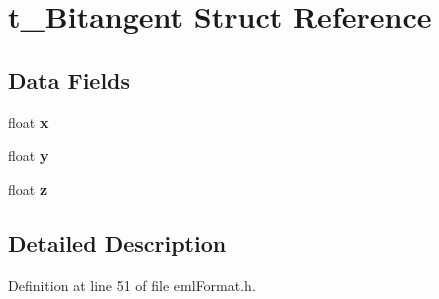 \hypertarget{structt___bitangent}{}\section{t\+\_\+\+Bitangent Struct Reference}
\label{structt___bitangent}
\subsection*{Data Fields}
\begin{DoxyCompactItemize}
\item 
float {\bfseries x}\hypertarget{structt___bitangent_ad72b72e1c2d99d613519bfb1416d5fa5}{}\label{structt___bitangent_ad72b72e1c2d99d613519bfb1416d5fa5}

\item 
float {\bfseries y}\hypertarget{structt___bitangent_add34b32ca165f6ac862be139eba8c78d}{}\label{structt___bitangent_add34b32ca165f6ac862be139eba8c78d}

\item 
float {\bfseries z}\hypertarget{structt___bitangent_a19b81d7b31b6e84a5cef12c88251c3d1}{}\label{structt___bitangent_a19b81d7b31b6e84a5cef12c88251c3d1}

\end{DoxyCompactItemize}


\subsection{Detailed Description}


Definition at line 51 of file eml\+Format.\+h.

